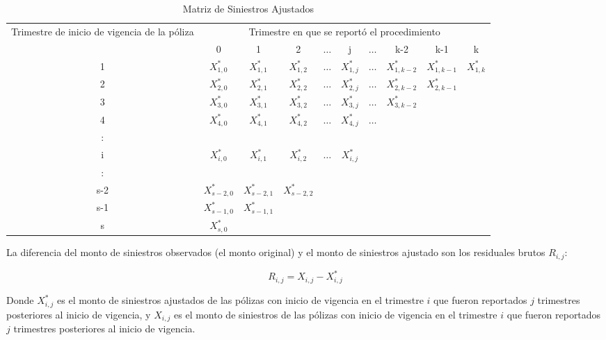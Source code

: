 \documentclass[11pt,twoside,openright,spanish]{report}
\numberwithin{equation}{chapter}
\numberwithin{figure}{chapter}
\numberwithin{table}{chapter}
\begin{document}
	\begin{table}[ht]
		\centering
			\caption{Matriz de Siniestros  Ajustados}
		\begin{tabularx}{\linewidth}{ c|ccccccccc}
		\multirow{2}{4cm}{Trimestre de inicio de vigencia de la póliza}&  \multicolumn{9}{c}{Trimestre en que se reportó el procedimiento} \\
			& 0  & 1 & 2 & $ \dots $ & j & $\dots $ & k-2 & k-1 &  k \\
			\midrule
			1      &  $X_{1,0}^{*}$ & $X_{1,1}^{*}$ & $X_{1,2}^{*}$ & $ \dots $ & $X_{1,j}^{*}$ & $ \dots $ & $X_{1,k-2}^{*}$ & $X_{1,k-1}^{*}$ & $X_{1,k}^{*}$ \\
			2      &  $X_{2,0}^{*}$ & $X_{2,1}^{*}$ & $X_{2,2}^{*}$ & $ \dots $ & $X_{2,j}^{*}$ & $ \dots $ & $X_{2,k-2}^{*}$ & $X_{2,k-1}^{*}$ & \\
			3      &  $X_{3,0}^{*}$ & $X_{3,1}^{*}$ & $X_{3,2}^{*}$ & $ \dots $ & $X_{3,j}^{*}$ & $ \dots $ & $X_{3,k-2}^{*}$ & & \\
			4      &  $X_{4,0}^{*}$ & $X_{4,1}^{*}$ & $X_{4,2}^{*}$ & $ \dots $ & $X_{4,j}^{*}$ & $ \dots $ & & & \\
			:      & & & & & & & & &\\
			i      &  $X_{i,0}^{*}$ & $X_{i,1}^{*}$ & $X_{i,2}^{*}$ & $ \dots $ & $X_{i,j}^{*}$ & & & & \\
			:      & & & & & & & & & \\
			s-2      &  $X_{s-2,0}^{*}$ & $X_{s-2,1}^{*}$ & $X_{s-2,2}^{*}$ & & & & & & \\
			s-1      &  $X_{s-1,0}^{*}$ & $X_{s-1,1}^{*}$ & & & & & & & \\
			s      &  $X_{s,0}^{*}$ & & & & & & & & \\
		\end{tabularx}
	\end{table}
		
	La diferencia del monto de siniestros observados (el monto original) y el monto de siniestros ajustado son los residuales brutos $R_{i,j}^{}$:
		
	$$R_{i,j}^{}= X_{i,j}^{} - X_{i,j}^{*} $$ 
	
	Donde ${X}_{i,j}^{*}$ es el monto de siniestros ajustados de las pólizas con inicio de vigencia en el trimestre $i$ que fueron reportados $j$ trimestres posteriores al inicio de vigencia, y ${X}_{i,j}$ es el monto de siniestros de las pólizas con inicio de vigencia en el trimestre $i$ que fueron reportados $j$ trimestres posteriores al inicio de vigencia.	
	
\end{document}
